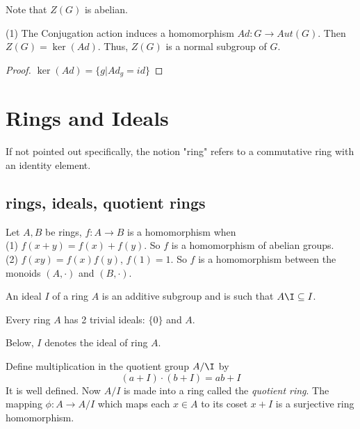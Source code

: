 \documentclass[11pt,fleqn]{book} %
\begin{document}
\begin{CJK}{UTF8}{gkai}
\begin{remark}
	Note that $Z(G)$ is abelian.
\end{remark}
\begin{proposition}
	(1) The Conjugation action induces a homomorphism $Ad: G \to Aut(G)$. Then $Z(G) = \ker (Ad)$. Thus, $Z(G)$ is a normal subgroup of $G$.
\end{proposition}
\begin{proof}
	$\ker (Ad) = \{g | Ad_g = id\}$	
\end{proof}

\chapter{Rings and Ideals}
If not pointed out specifically, the notion "ring" refers to a commutative ring with an identity element. 

\section{rings, ideals, quotient rings}
\begin{definition}
	 Let $A, B$ be rings, $f : A\to B$ is a homomorphism when \\
	(1) $f(x+y) = f(x) + f(y)$. So $f$ is a homomorphism of abelian groups. \\
	(2) $f(xy) = f(x)f(y)$, $f(1) = 1$. So $f$ is a homomorphism between the monoids $(A, \cdot)$ and $(B, \cdot)$.

\end{definition}
\begin{definition}
	 An ideal $I$ of a ring $A$ is an additive subgroup and is such that $A\I \subseteq I$.
\end{definition}
\begin{example}
	Every ring $A$ has 2 trivial ideals: $\{0\}$ and $A$.
\end{example}

Below, $I$ denotes the ideal of ring $A$.
\begin{definition}
	 Define multiplication in the quotient group $A/\I$ by\\
	\[(a + I) \cdot (b + I) = ab + I\]
	It is well defined. Now $A/I$ is made into a ring called the {\it quotient ring}. The mapping $\phi: A \to A/I$ which maps each $x \in A$ to its coset $x + I$ is a surjective ring homomorphism.
\end{definition}


\end{CJK}
\end{document}
